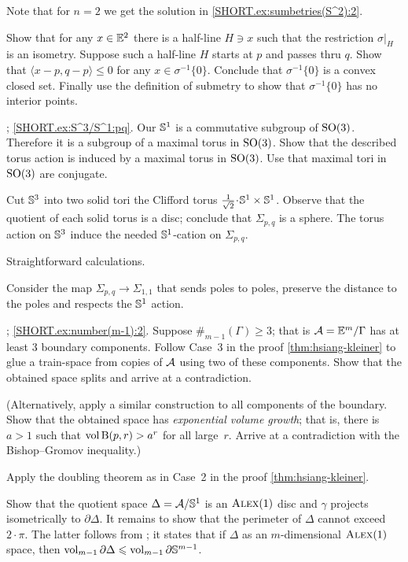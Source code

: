 Note that for $n=2$ we get the solution in \ref{SHORT.ex:sumbetries(S^2):2}.

Show that for any $x\in\mathbb{E}^2$ there is a half-line $H\ni x$ such that 
the restriction $\sigma|_H$ is an isometry.
Suppose such a half-line $H$ starts at $p$ and passes thru $q$.
Show that $\langle x-p,q-p \rangle\le 0$ for any $x\in \sigma^{-1}\{0\}$.
Conclude that $\sigma^{-1}\{0\}$ is a convex closed set.
Finally use the definition of submetry to show that  $\sigma^{-1}\{0\}$ has no interior points. 

\parbf{\ref{ex:S^3/S^1}};
\ref{SHORT.ex:S^3/S^1:pq}.
Our $\mathbb{S}^1$ is a commutative subgroup of $\mathrm{SO}(3)$.
Therefore it is a subgroup of a maximal torus in $\mathrm{SO}(3)$.
Show that the described torus action is induced by a maximal torus in $\mathrm{SO}(3)$.
Use that maximal tori in $\mathrm{SO}(3)$ are conjugate.

Cut $\mathbb{S}^3$ into two solid tori the Clifford torus $\tfrac1{\sqrt2}\cdot \SSS^1\times \SSS^1$.
Observe that the quotient of each solid torus is a disc;
conclude that $\Sigma_{p,q}$ is a sphere.
The torus action on $\mathbb{S}^3$ induce the needed $\mathbb{S}^1$-cation on $\Sigma_{p,q}$.

 Straightforward calculations.

Consider the map $\Sigma_{p,q}\to\Sigma_{1,1}$ that sends poles to poles,
preserve the distance to the poles and respects the $\mathbb{S}^1$ action.

\parbf{\ref{ex:number(m-1)}};
\ref{SHORT.ex:number(m-1):2}.
Suppose $\#_{m-1}(\Gamma)\ge 3$;
that is $\mathcal{A}=\mathbb{E}^m/\Gamma$ has at least 3 boundary components.
Follow Case~3 in the proof \ref{thm:hsiang-kleiner} to glue a train-space from copies of $\mathcal{A}$ using two of these components.
Show that the obtained space splits and arrive at a contradiction.

(Alternatively, apply a similar construction to all components of the boundary.
Show that the obtained space has {}\emph{exponential volume growth};
that is, there is $a>1$ such that $\operatorname{\rm vol}\nolimits \mathrm{B}{}(p,r)>a^r$ for all large~$r$.
Arrive at a contradiction with the Bishop--Gromov inequality.)

Apply the doubling theorem as in Case~2 in the proof \ref{thm:hsiang-kleiner}.

Show that the quotient space $\Delta=\mathcal{A}/\mathbb{S}^1$ is an $\textsc{Alex}(1)$ disc and $\gamma$ projects isometrically to $\partial\Delta$.
It remains to show that the perimeter of $\Delta$ cannot exceed $2\cdot\pi$.
The latter follows from \cite[3.3.5]{petrunin:survey};
it states that if $\Delta$ as an $m$-dimensional $\textsc{Alex}(1)$ space, then $\operatorname{\rm vol}\nolimits_{m-1}\partial \Delta\leqslant \operatorname{\rm vol}\nolimits_{m-1}\partial \mathbb{S}^{m-1}$.

